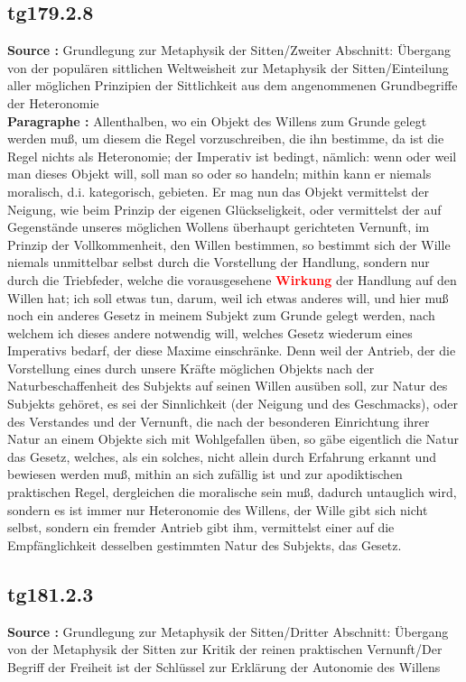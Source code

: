 \documentclass[a4paper,12pt,twoside]{book}
\newcommand{\match}[1]{\textcolor{red}{\textbf{#1}}}
\begin{document}
	\subsection*{tg179.2.8} 
	\textbf{Source : }Grundlegung zur Metaphysik der Sitten/Zweiter Abschnitt: Übergang von der populären sittlichen Weltweisheit zur Metaphysik der Sitten/Einteilung aller möglichen Prinzipien der Sittlichkeit aus dem angenommenen Grundbegriffe der Heteronomie\\  
	
	\noindent\textbf{Paragraphe : }Allenthalben, wo ein Objekt des Willens zum Grunde gelegt werden muß, um diesem die Regel vorzuschreiben, die ihn bestimme, da ist die Regel nichts als Heteronomie; der Imperativ ist bedingt, nämlich: wenn oder weil man dieses Objekt will, soll man so oder so handeln; mithin kann er niemals moralisch, d.i. kategorisch, gebieten. Er mag nun das Objekt vermittelst der Neigung, wie beim Prinzip der eigenen Glückseligkeit, oder vermittelst der auf Gegenstände unseres möglichen Wollens überhaupt gerichteten Vernunft, im Prinzip der Vollkommenheit, den Willen bestimmen, so bestimmt sich der Wille niemals unmittelbar selbst durch die Vorstellung der Handlung, sondern nur durch die Triebfeder, welche die vorausgesehene \match{Wirkung} der Handlung auf den Willen hat; ich soll etwas tun, darum, weil ich etwas anderes will, und hier muß noch ein anderes Gesetz in meinem Subjekt zum Grunde gelegt werden, nach welchem ich dieses andere notwendig will, welches Gesetz wiederum eines Imperativs bedarf, der diese Maxime einschränke. Denn weil der Antrieb, der die Vorstellung eines durch unsere Kräfte möglichen Objekts nach der Naturbeschaffenheit des Subjekts auf seinen Willen ausüben soll, zur Natur des Subjekts gehöret, es sei der Sinnlichkeit (der Neigung und des Geschmacks), oder des Verstandes und der Vernunft, die nach der besonderen Einrichtung ihrer Natur an einem Objekte sich mit Wohlgefallen üben, so gäbe eigentlich die Natur das Gesetz, welches, als ein solches, nicht allein durch Erfahrung erkannt und bewiesen werden muß, mithin an sich zufällig ist und zur apodiktischen praktischen Regel, dergleichen die moralische sein muß, dadurch untauglich wird, sondern es ist immer nur Heteronomie des Willens, der Wille gibt sich nicht selbst, sondern ein fremder Antrieb gibt ihm, vermittelst  einer auf die Empfänglichkeit desselben gestimmten Natur des Subjekts, das Gesetz. 
	
	\subsection*{tg181.2.3} 
	\textbf{Source : }Grundlegung zur Metaphysik der Sitten/Dritter Abschnitt: Übergang von der Metaphysik der Sitten zur Kritik der reinen praktischen Vernunft/Der Begriff der Freiheit ist der Schlüssel zur Erklärung der Autonomie des Willens\\  
	
\end{document}
